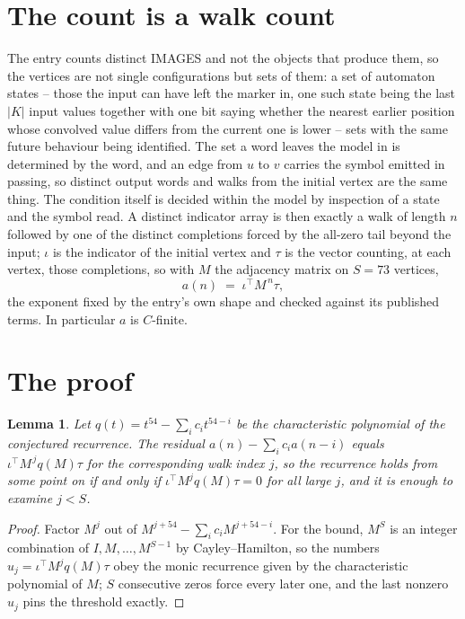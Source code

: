 \documentclass[11pt,a4paper]{article}
\theoremstyle{plain}
\newtheorem{lemma}[theorem]{Lemma}
\theoremstyle{definition}
\begin{document}
\section{The count is a walk count}

The entry counts distinct IMAGES and not the objects that produce them, so the vertices are not single configurations but sets of them: a set of automaton states -- those the input can have left the marker in, one such state being the last $|K|$ input values together with one bit saying whether the nearest earlier position whose convolved value differs from the current one is lower -- sets with the same future behaviour being identified. The set a word leaves the model in is determined by the word, and an edge from $u$ to $v$ carries the symbol emitted in passing, so distinct output words and walks from the initial vertex are the same thing. The condition itself is decided within the model by inspection of a state and the symbol read.
A distinct indicator array is then exactly a walk of length $n$ followed by one of the distinct completions forced by the all-zero tail beyond the input; $\iota$ is the indicator of the initial vertex and $\tau$ is the vector counting, at each vertex, those completions, so with $M$ the adjacency matrix on $S=73$ vertices,
\[
a(n)\;=\;\iota^{\!\top}M^{\,n}\tau ,
\]
the exponent fixed by the entry's own shape and checked against its published terms. In
particular $a$ is $C$-finite.

\section{The proof}

\begin{lemma}\label{lem:crit}
Let $q(t)=t^{54}-\sum_i c_it^{54-i}$ be the characteristic polynomial of the
conjectured recurrence. The residual $a(n)-\sum_ic_ia(n-i)$ equals
$\iota^{\!\top}M^{\,j}q(M)\tau$ for the corresponding walk index $j$, so the recurrence
holds from some point on if and only if $\iota^{\!\top}M^{j}q(M)\tau=0$ for all large $j$,
and it is enough to examine $j<S$.
\end{lemma}

\begin{proof}
Factor $M^{j}$ out of $M^{j+54}-\sum_ic_iM^{j+54-i}$. For the bound, $M^{S}$
is an integer combination of $I,M,\dots,M^{S-1}$ by Cayley--Hamilton, so the numbers
$u_j=\iota^{\!\top}M^{j}q(M)\tau$ obey the monic recurrence given by the characteristic
polynomial of $M$; $S$ consecutive zeros force every later one, and the last nonzero $u_j$
pins the threshold exactly.
\end{proof}
\end{document}
